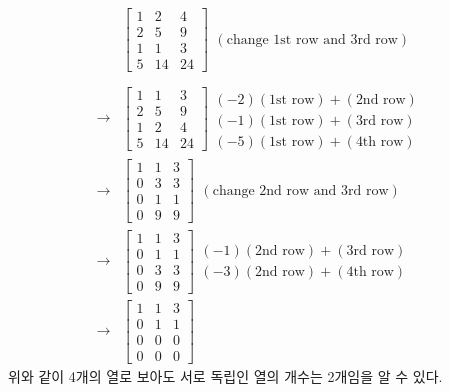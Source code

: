 \documentclass[
  11pt,
  a4paper,
  oneside]{scrbook}
\theoremstyle{definition}
\theoremstyle{definition}
\theoremstyle{plain}
\theoremstyle{remark}
\begin{document}
\[
\begin{aligned}
 & 
\begin{bmatrix}
1 & 2 & 4 \\
2 & 5 & 9 \\
1 & 1 & 3 \\
5 & 14 & 24
\end{bmatrix}
\begin{array}{c}
\\
(\text{change 1st row and 3rd row}) 
\\
\end{array} \\
 \\
 \rightarrow & 
\begin{bmatrix}
1 & 1 & 3 \\
2 & 5 & 9 \\
1 & 2 & 4 \\
5 & 14 & 24
\end{bmatrix}
\begin{array}{c}
\\
(-2)(\text{1st row}) + (\text{2nd row}) \\
(-1)(\text{1st row}) + (\text{3rd row}) \\
(-5)(\text{1st row}) + (\text{4th row}) 
\end{array} \\
 \rightarrow & 
\begin{bmatrix}
1 & 1 & 3 \\
0 & 3 & 3 \\
0 & 1 & 1 \\
0 & 9 & 9
\end{bmatrix}
\begin{array}{c}
\\
\\
(\text{change 2nd row and 3rd row}) \\
\\
\end{array} \\
 \rightarrow & 
\begin{bmatrix}
1 & 1 & 3 \\
0 & 1 & 1 \\
0 & 3 & 3 \\
0 & 9 & 9
\end{bmatrix}
\begin{array}{c}
\\
(-1)(\text{2nd row}) + (\text{3rd row}) \\
(-3)(\text{2nd row}) + (\text{4th row}) 
\\
\end{array} \\
 \rightarrow & 
\begin{bmatrix}
1 & 1 & 3 \\
0 & 1 & 1 \\
0 & 0 & 0 \\
0 & 0 & 0
\end{bmatrix}
\end{aligned}
\] 위와 같이 4개의 열로 보아도 서로 독립인 열의 개수는 2개임을 알 수
있다.
\end{document}
